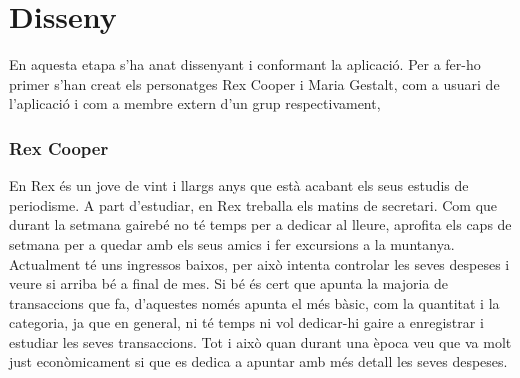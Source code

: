 \section{Disseny}
En aquesta etapa s'ha anat dissenyant i conformant la aplicació. Per a fer-ho primer s'han creat els personatges Rex Cooper i Maria Gestalt, com a usuari de l'aplicació i com a membre extern d'un grup respectivament,

\subsubsection{Rex Cooper}

En Rex és un jove de vint i llargs anys que està acabant els seus estudis de periodisme. A part d’estudiar, en Rex treballa els matins de secretari. Com que durant la setmana gairebé no té temps per a dedicar al lleure, aprofita els caps de setmana per a quedar amb els seus amics i fer excursions a la muntanya. 
Actualment té uns ingressos baixos, per això intenta controlar les seves despeses i veure si arriba bé a final de mes. Si bé és cert que apunta la majoria de transaccions que fa, d'aquestes només apunta el més bàsic, com la quantitat i la categoria, ja que en general, ni té temps ni vol dedicar-hi gaire a enregistrar i estudiar les seves transaccions. Tot i això quan durant una època veu que va molt just econòmicament si que es dedica a apuntar amb més detall les seves despeses.

